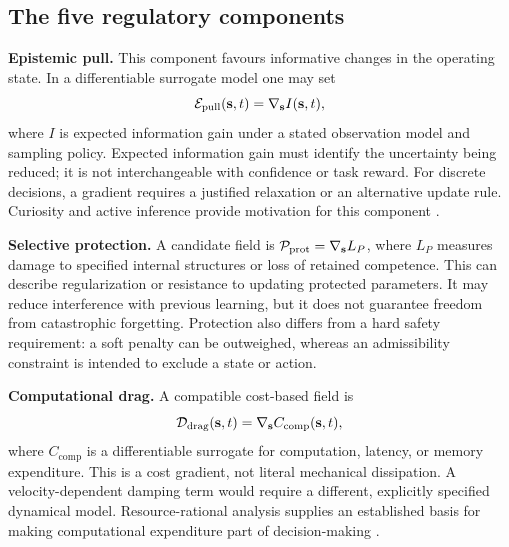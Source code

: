 

\subsection{The five regulatory components}
\label{subsec:epistemic}
\textbf{Epistemic pull.} This component favours informative changes in the operating state. In a differentiable surrogate model one may set
\begin{equation}
 \mathcal{E}_{\mathrm{pull}}(\mathbf{s},t)=\nabla_{\mathbf{s}} I(\mathbf{s},t),
 \label{eq:epistemic_pull}
\end{equation}
where $I$ is expected information gain under a stated observation model and sampling policy. Expected information gain must identify the uncertainty being reduced; it is not interchangeable with confidence or task reward. For discrete decisions, a gradient requires a justified relaxation or an alternative update rule. Curiosity and active inference provide motivation for this component \citep{dubey2019curiosity,parr2018generalised}.

\textbf{Selective protection.} A candidate field is $\mathcal{P}_{\mathrm{prot}}=\nabla_{\mathbf{s}}L_P$, where $L_P$ measures damage to specified internal structures or loss of retained competence. This can describe regularization or resistance to updating protected parameters. It may reduce interference with previous learning, but it does not guarantee freedom from catastrophic forgetting. Protection also differs from a hard safety requirement: a soft penalty can be outweighed, whereas an admissibility constraint is intended to exclude a state or action.

\textbf{Computational drag.} A compatible cost-based field is
\begin{equation}
 \mathcal{D}_{\mathrm{drag}}(\mathbf{s},t)=\nabla_{\mathbf{s}} C_{\mathrm{comp}}(\mathbf{s},t),
 \label{eq:drag}
\end{equation}
where $C_{\mathrm{comp}}$ is a differentiable surrogate for computation, latency, or memory expenditure. This is a cost gradient, not literal mechanical dissipation. A velocity-dependent damping term would require a different, explicitly specified dynamical model. Resource-rational analysis supplies an established basis for making computational expenditure part of decision-making \citep{lieder2019resourcerational}.

